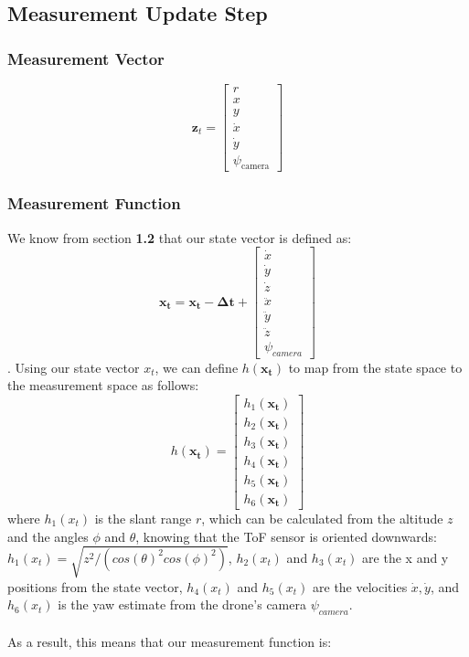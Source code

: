 \documentclass{article}
\begin{document}
\subsection{Measurement Update Step}

\subsubsection{Measurement Vector}

\begin{equation}
\mathbf{z}_t = \begin{bmatrix}
r \\
x \\
y \\
\dot x \\
\dot y \\
\psi_{\text{camera}}
\end{bmatrix}
\end{equation}

\subsubsection{Measurement Function}
We know from section \textbf{1.2} that our state vector is defined as: \begin{equation}
    \mathbf{x_t} = \mathbf{x_t - \Delta t} + \begin{bmatrix}
    \dot x \\
    \dot y \\
    \dot z \\
    \ddot x \\
    \ddot y \\
    \ddot z \\
    \psi_{\textit{camera}}
\end{bmatrix}
\end{equation}. Using our state vector $x_t$, we can define $h(\mathbf{x_t})$ to map from the state space to the measurement space as follows: 
\begin{equation}
    h(\mathbf{x_t}) = \begin{bmatrix}
    h_1(\mathbf{x_t}) \\
    h_2(\mathbf{x_t}) \\
    h_3(\mathbf{x_t}) \\
    h_4(\mathbf{x_t}) \\
    h_5(\mathbf{x_t}) \\
    h_6(\mathbf{x_t})
\end{bmatrix}
\end{equation} where $h_1(x_t)$ is the slant range $r$, which can be calculated from the altitude $z$ and the angles $\phi$ and $\theta$, knowing that the ToF sensor is oriented downwards: $h_1(x_t) = \sqrt{z^2/(cos(\theta)^2cos(\phi)^2)}$, $h_2(x_t)$ and $h_3(x_t)$ are the x and y positions from the state vector, $h_4(x_t)$ and $h_5(x_t)$ are the velocities $\dot x, \dot y$, and $h_6(x_t)$ is the yaw estimate from the drone's camera $\psi_\textit{camera}$. \\ \\
As a result, this means that our measurement function is: \\
\end{document}
